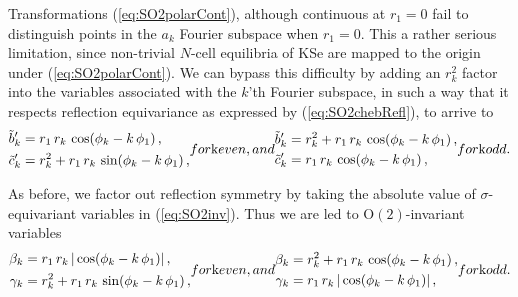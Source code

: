 \documentclass[aip,cha,showpacs,twocolumn, 
 		  reprint]{revtex4-1} %
\newcommand{\bseq}{\begin{subequations}}
\newcommand{\eseq}{\end{subequations}}
\newcommand{\refeq}  [1] {(\ref{#1})}
\newcommand{\On}[1]{\ensuremath{\textrm{O}(#1)}}
\newcommand{\Refl}{\ensuremath{\sigma}}
\begin{document}
Transformations \refeq{eq:SO2polarCont}, although continuous at
$r_1=0$ fail to distinguish points in the $a_k$ Fourier subspace when $r_1=0$.
This a rather serious limitation, since non-trivial $N$-cell equilibria of
KSe are mapped to the origin under \refeq{eq:SO2polarCont}.
We can bypass this difficulty by adding an $r_k^2$ factor into the variables
associated with the $k$'th Fourier subspace, in such a way that it respects
reflection equivariance as expressed by \refeq{eq:SO2chebRefl}, to arrive to
\bseq\label{eq:SO2inv}
  \begin{align}
    \tilde{b}'_k &= 
		    r_1\,r_k\, \cos(\phi_k-k\,\phi_1)\,, \\
    \tilde{c}'_k &=
		    r_k^2+r_1\,r_k\,\sin(\phi_k-k\,\phi_1)\,,
  \end{align}
for $k$ even, and
  \begin{align}
    \tilde{b}'_k &= 
		    r_k^2+r_1\,r_k\, \cos(\phi_k-k\,\phi_1)\,, \\
    \tilde{c}'_k &=
		    r_1\,r_k\, \cos(\phi_k-k\,\phi_1)\,,
  \end{align}
for $k$ odd.
\eseq

As before, we factor out reflection symmetry by taking the absolute value 
of $\Refl$-equivariant variables in \refeq{eq:SO2inv}. 
Thus we are led to $\On{2}$-invariant variables
\bseq\label{eq:O2inv}
  \begin{align}
    \beta_k &= 
		    r_1\,r_k\, |\cos(\phi_k-k\,\phi_1)|\,, \\
    \gamma_k &=
		    r_k^2+r_1\,r_k\,\sin(\phi_k-k\,\phi_1)\,,
  \end{align}
for $k$ even, and
  \begin{align}
    \beta_k &= 
		    r_k^2+r_1\,r_k\, \cos(\phi_k-k\,\phi_1)\,, \\
    \gamma_k &=
		    r_1\,r_k\, |\cos(\phi_k-k\,\phi_1)|\,,
  \end{align}
for $k$ odd.
\eseq
 
\end{document}
